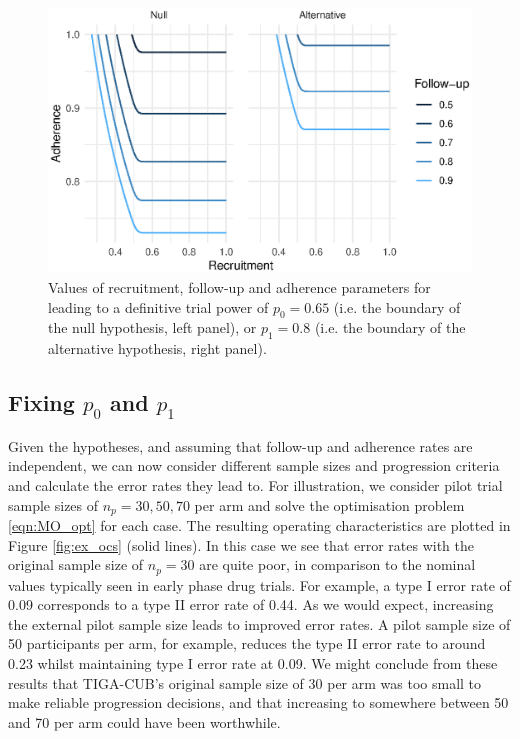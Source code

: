 \documentclass{article}
\begin{document}
\begin{figure}
\centering
\includegraphics[scale=0.8]{hyps}
\caption{Values of recruitment, follow-up and adherence parameters for leading to a definitive trial power of $p_0 = 0.65$ (i.e. the boundary of the null hypothesis, left panel), or $p_1 = 0.8$ (i.e. the boundary of the alternative hypothesis, right panel).}
\label{fig:hyps}
\end{figure}

\subsection{Fixing $p_0$ and $p_1$}

Given the hypotheses, and assuming that follow-up and adherence rates are independent, we can now consider different sample sizes and progression criteria and calculate the error rates they lead to. For illustration, we consider pilot trial sample sizes of $n_p = 30, 50, 70$ per arm and solve the optimisation problem \ref{eqn:MO_opt} for each case. The resulting operating characteristics are plotted in Figure \ref{fig:ex_ocs} (solid lines). In this case we see that error rates with the original sample size of $n_p = 30$ are quite poor, in comparison to the nominal values typically seen in early phase drug trials. For example, a type I error rate of 0.09 corresponds to a type II error rate of 0.44. As we would expect, increasing the external pilot sample size leads to improved error rates. A pilot sample size of 50 participants per arm, for example, reduces the type II error rate to around 0.23 whilst maintaining type I error rate at 0.09. We might conclude from these results that TIGA-CUB's original sample size of 30 per arm was too small to make reliable progression decisions, and that increasing to somewhere between 50 and 70 per arm could have been worthwhile.
\end{document}
